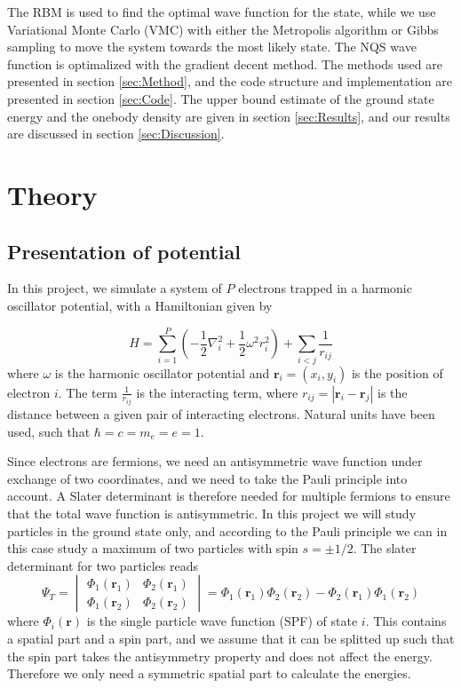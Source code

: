 \documentclass[norsk,a4paper,12pt]{article}
\begin{document}
The RBM is used to find the optimal wave function for the state, while we use Variational Monte Carlo (VMC) with either the Metropolis algorithm or Gibbs sampling to move the system towards the most likely state. The NQS wave function is optimalized with the gradient decent method.  The methods used are presented in section \ref{sec:Method}, and the code structure and implementation are presented in section \ref{sec:Code}. The upper bound estimate of the ground state energy and the onebody density are given in section \ref{sec:Results}, and our results are discussed in section \ref{sec:Discussion}.


 


\section{Theory} \label{sec:Theory}
\subsection{Presentation of potential} \label{sec:Presentation_of_potential}
In this project, we simulate a system of $P$ electrons trapped in a harmonic oscillator potential, with a Hamiltonian given by

\begin{equation}
\label{eq:Hamiltonian}
\hat{H} = \sum_{i=1}^{P} (-\frac{1}{2} \nabla_i^2 + \frac{1}{2} \omega^2 r_i ^2) + \sum_{i<j} \frac{1}{r_{ij}} 
\end{equation}
where $\omega$ is the harmonic oscillator potential and  $\boldsymbol{r}_i = (x_i, y_i)$ is the position of electron $i$. The term $\frac{1}{r_{ij}}$ is the interacting term, where $r_{ij} = |\boldsymbol{r}_i - \boldsymbol{r}_j|$ is the distance between a given pair of interacting electrons. Natural units have been used, such that $\hbar = c = m_e = e = 1$.

Since electrons are fermions, we need an antisymmetric wave function under exchange of two coordinates, and we need to take the Pauli principle into account. A Slater determinant is therefore needed for multiple fermions to ensure that the total wave function is antisymmetric. In this project we will study particles in the ground state only, and according to the Pauli principle we can in this case study a maximum of two particles with spin $s=\pm 1/2$. The slater determinant for two particles reads
\begin{equation}
\Psi_T=
\begin{vmatrix}
\Phi_1(\boldsymbol{r}_1) & \Phi_2(\boldsymbol{r}_1)\\
\Phi_1(\boldsymbol{r}_2) & \Phi_2(\boldsymbol{r}_2)
\end{vmatrix}
=\Phi_1(\boldsymbol{r}_1)\Phi_2(\boldsymbol{r}_2)-\Phi_2(\boldsymbol{r}_1)\Phi_1(\boldsymbol{r}_2)
\end{equation}
where $\Phi_i(\boldsymbol{r})$ is the single particle wave function (SPF) of state $i$. This contains a spatial part and a spin part, and we assume that it can be splitted up such that the spin part takes the antisymmetry property and does not affect the energy. Therefore we only need a symmetric spatial part to calculate the energies.
\end{document}
